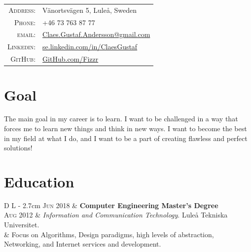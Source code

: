 \documentclass[a4paper,10pt]{article}
\begin{document}
\begin{tabular}{Dl}
    \textsc{Address:}	&	 Vänortsvägen 5, Luleå, Sweden \\
    \textsc{Phone:}		&	 +46 73 763 87 77\\
    \textsc{email:}		&	 \href{mailto:Claes.Gustaf.Andersson@gmail.com}{Claes.Gustaf.Andersson@gmail.com}\\
    \textsc{Linkedin:}	&	 \url{se.linkedin.com/in/ClaesGustaf} \\
    \textsc{GitHub:}		&	 \href{https://github.com/Fizzr}{GitHub.com/Fizzr}
\end{tabular}

\section{Goal}
{\small The main goal in my career is to learn. I want to be challenged in a way that forces me to learn new things and think in new ways. I want to become the best in my field at what I do, and I want to be a part of creating flawless and perfect solutions!}

\section{Education}
\begin{tabular}{D L {\textwidth - 2.7cm}}
\textsc{Jun 2018}	&	\textbf{Computer Engineering Master's Degree}\\
\textsc{Aug 2012}	&	 \emph{Information and Communication Technology}. Luleå Tekniska Universitet.\\
			&	{\small Focus on Algorithms, Design paradigms, high levels of abstraction, Networking, and Internet services and development.}
\end{tabular}


\end{document}
